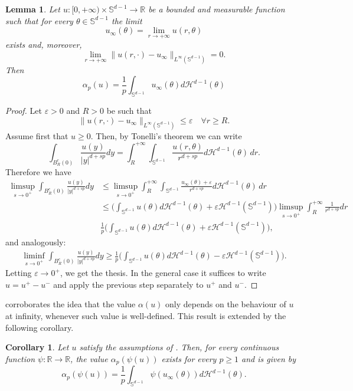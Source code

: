 \documentclass[reqno,11pt]{amsart}
\numberwithin{equation}{section}
\theoremstyle{definition} %
\theoremstyle{plain}
\newtheorem{lemma}[lemma]{Lemma}
\newtheorem{cor}[cor]{Corollary}
\theoremstyle{definition}
\theoremstyle{remark}
\def\elle#1{L^{#1}}
\def\Sd{{\mathbb{S}^{d-1}}}
\def\Haus{{\mathcal{H}^{d-1}}}
\def\norma#1#2{ \|#1 \|_{#2}}
\def \e{\varepsilon}
\def\R{\mathbb{R}}
\newcommand{\abs}[1]{\left|#1\right|}
\begin{document}
\begin{lemma}\label{lemma: integral at infinity}
    Let $u\colon [0,+\infty)\times \Sd\to\R$ be a bounded and measurable function such that for every $\theta\in\Sd$ the limit
    \[u_\infty(\theta)=\lim_{r\to+\infty} u(r,\theta)\]
    exists and, moreover, 
    \[\lim_{r\to+\infty}\norma{u(r,\cdot)-u_\infty}{\elle\infty(\Sd)}=0.\]
    Then
    \[
    \alpha_p(u)=\frac1p\int_\Sd u_\infty(\theta)d\Haus(\theta)
    \]
\end{lemma}
\begin{proof}
    Let $\e>0$ and $R>0$ be such that
    \[
    \norma{u(r,\cdot)-u_\infty}{\elle\infty(\Sd)}\leq \e\quad\forall r\geq R.
    \]
    Assume first that $u\geq 0$. Then, by Tonelli's theorem we can write 
    \[\int_{B_R^c(0)}\frac{u(y)}{\abs{y}^{d+sp}}dy= \int_R^{+\infty}\int_{\Sd}\frac{u(r,\theta)}{r^{d+sp}}d\Haus(\theta)\, dr.\]
    Therefore we have
    \begin{equation}
        \begin{split}
            \limsup_{s\to0^+}\int_{B_R^c(0)}\frac{u(y)}{\abs{y}^{d+sp}}dy
            &
            \leq \limsup_{s\to0^+}\int_R^{+\infty}\int_{\Sd}\frac{u_\infty(\theta)+\e}{r^{d+sp}}d\Haus(\theta)\, dr \\
            &\leq \Big(\int_\Sd u(\theta)d\Haus(\theta) +\e\Haus(\Sd)\Big)\limsup_{s\to0^+}\int_R^{+\infty}\frac1{r^{d+sp}}dr\\
            &\frac1p\Big(\int_\Sd u(\theta)d\Haus(\theta) +\e\Haus(\Sd)\Big),
        \end{split}
    \end{equation}
    and analogously: 
    \begin{equation}
        \begin{split}
            \liminf_{s\to0^+}\int_{B_R^c(0)}\frac{u(y)}{\abs{y}^{d+sp}}dy\geq \frac1p\Big(\int_\Sd u(\theta)d\Haus(\theta) -\e\Haus(\Sd)\Big).
        \end{split}
    \end{equation}
    Letting $\e\to0^+$, we get the thesis. In the general case it suffices to write $u=u^+-u^-$ and apply the previous step separately to $u^+$ and $u^-$. 
\end{proof}

 corroborates the idea that the value $\alpha(u)$ only depends on the behaviour of $u$ at infinity, whenever such value is well-defined. This  result is extended by the following corollary.
\begin{cor}\label{cor:composition alpha}
    Let $u$ satisfy the assumptions of . Then, for every continuous function $\psi:\R\to\R$, the value $\alpha_p(\psi(u))$ exists for every $p\geq 1$ and is given by
    \begin{equation}
        \alpha_p(\psi(u))=\frac1p 
        \int_\Sd \psi(u_\infty(\theta))d\Haus(\theta).
    \end{equation}
\end{cor}
\end{document}
